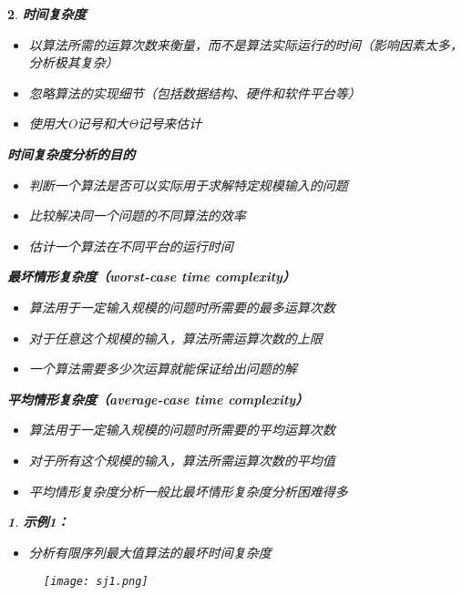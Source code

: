 \documentclass[UTF8]{report}
\theoremstyle{MyLineTheoremStyle} %
\theoremstyle{MyBlockTheoremStyle} %
\theoremstyle{MySubsubsectionStyle} %
\newtheorem{definition}{}
\begin{document}
\begin{definition}
    \textbf{时间复杂度}
    \begin{itemize}
        \item 以算法所需的运算次数来衡量，而不是算法实际运行的时间（影响因素太多，分析极其复杂）
        \item 忽略算法的实现细节（包括数据结构、硬件和软件平台等）
        \item 使用大O记号和大Θ记号来估计
    \end{itemize}

    \textbf{时间复杂度分析的目的}
    \begin{itemize}
        \item 判断一个算法是否可以实际用于求解特定规模输入的问题
        \item 比较解决同一个问题的不同算法的效率
        \item 估计一个算法在不同平台的运行时间
    \end{itemize}

    \textbf{最坏情形复杂度（worst-case time complexity）}
    \begin{itemize}
        \item 算法用于一定输入规模的问题时所需要的最多运算次数
        \item 对于任意这个规模的输入，算法所需运算次数的上限
        \item 一个算法需要多少次运算就能保证给出问题的解
    \end{itemize}

    \textbf{平均情形复杂度（average-case time complexity）}
    \begin{itemize}
        \item 算法用于一定输入规模的问题时所需要的平均运算次数
        \item 对于所有这个规模的输入，算法所需运算次数的平均值
        \item 平均情形复杂度分析一般比最坏情形复杂度分析困难得多
    \end{itemize}
\begin{definition}
    \textbf{示例1：}
    \begin{itemize}
        \item 分析有限序列最大值算法的最坏时间复杂度
    \end{itemize}

    \begin{figure}[ht]
        \centering
        \texttt{[image: sj1.png]}
    \end{figure}


\end{definition}
\end{definition}
\end{document}
